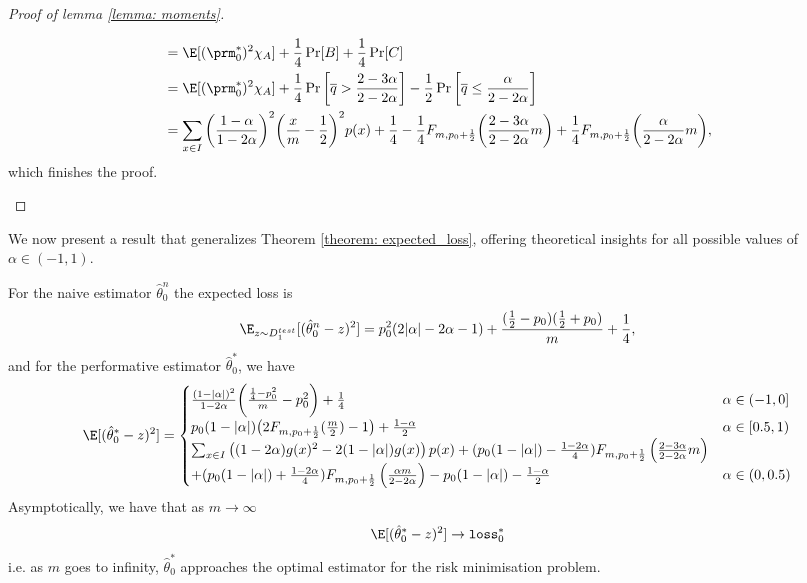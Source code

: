 \begin{proof}[Proof of lemma \ref{lemma: moments}]
\begin{enumerate}[(i)]
\begin{align*}
&= \E[(\prm^\ast_0)^2 \chi_{A}] + \frac14 \Pr[B] + \frac14 \Pr[C]\\
&= \E[(\prm^\ast_0)^2 \chi_{A}] + \frac14 \Pr\bigg[\overline{q} > \frac{2-3\alpha}{2-2\alpha}\bigg] - \frac12 \Pr\bigg[\overline{q} \le \frac{\alpha}{2-2\alpha}\bigg]\\
&= \sum_{x \in I} \bigg(\frac{1 - \alpha}{1-2\alpha}\bigg)^2 \bigg(\frac{x}{m} - \frac12 \bigg)^2 p(x)  
+ \frac14  - \frac14 F_{m, p_0 + \frac12}\bigg( \frac{2 - 3\alpha}{2-2\alpha}m \bigg) 
+ \frac14 F_{m, p_0 + \frac12}\bigg( \frac{\alpha }{2-2\alpha}m\bigg),
\end{align*}
which finishes the proof.
\end{enumerate}
\end{proof}

We now present a result that generalizes Theorem \ref{theorem: expected_loss}, offering theoretical insights for all possible values of $\alpha \in (-1,1)$.
\begin{theorem} \label{theorem: expected_loss_full}
For the naive estimator $\hat{\theta}_0^n$ the expected loss is 
\begin{equation*}
\E_{z \sim D_1^{test}}[(\hat{\theta}_0^n - z)^2] = p_0^2 (2 |\alpha| - 2\alpha - 1) + \frac{(\frac12 - p_0)(\frac12 + p_0)}{m} + \frac14,
\end{equation*}
and for the performative estimator $\hat{\theta}_0^\ast$, we have 
\begin{align*}
\E[(\hat{\theta}_0^\ast - z)^2] = 
\begin{cases}
\frac{(1 - |\alpha|)^2}{1-2\alpha} \bigg( \frac{\frac14 - p_0^2}{m} - p_0^2 \bigg) + \frac14 & \alpha \in (-1, 0]\\
p_0 (1 - |\alpha|) \big(2F_{m, p_0 + \frac12}(\frac{m}{2}) - 1\big) + \frac{1-\alpha}{2} & \alpha \in [0.5, 1)\\
\sum_{x \in I}\left( (1 - 2\alpha)g(x)^2 - 2(1 - |\alpha|)g(x) \right) p(x) + (p_0(1-|\alpha|) - \frac{1-2\alpha}{4})F_{m, p_0 + \frac{1}{2}}\left( \frac{2 - 3\alpha}{2 - 2\alpha}m \right) & \\
 + (p_0(1-|\alpha|) + \frac{1-2\alpha}{4})F_{m, p_0 + \frac{1}{2}}\left( \frac{\alpha m}{2 - 2\alpha} \right) - p_0 (1-|\alpha|) - \frac{1-\alpha}{2}& \alpha \in (0, 0.5)
\end{cases}
\end{align*}
Asymptotically, we have that as $m \to \infty$
\begin{equation*}
\E[(\hat{\theta}_0^\ast - z)^2] \to \verb|loss|_0^\ast
\end{equation*}
i.e. as $m$ goes to infinity, $\hat{\theta}_0^\ast$ approaches the optimal estimator for the risk minimisation problem. 
\end{theorem}
